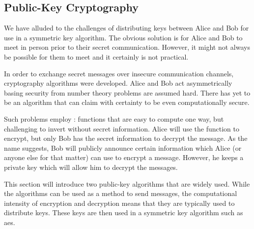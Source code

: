 

\subsection{Public-Key Cryptography}

We have alluded to the challenges of distributing keys between Alice and Bob for use in a symmetric key algorithm. The obvious solution is for Alice and Bob to meet in person prior to their secret communication. However, it might not always be possible for them to meet and it certainly is not practical. 

In order to exchange secret messages over insecure communication channels,  cryptography algorithms were developed. Alice and Bob act asymmetrically basing security from number theory problems are assumed hard. There has yet to be an algorithm that can claim with certainty to be even computationally secure.

Such problems employ : functions that are easy to compute one way, but challenging to invert without secret information. Alice will use the function to encrypt, but only Bob has the secret information to decrypt the message. As the name suggests, Bob will publicly announce certain information which Alice (or anyone else for that matter) can use to encrypt a message. However, he keeps a private key which will allow him to decrypt the messages.

This section will introduce two public-key algorithms that are widely used. While the algorithms can be used as a method to send messages, the computational intensity of encryption and decryption means that they are typically used to distribute keys. These keys are then used in a symmetric key algorithm such as \ac{aes}.


